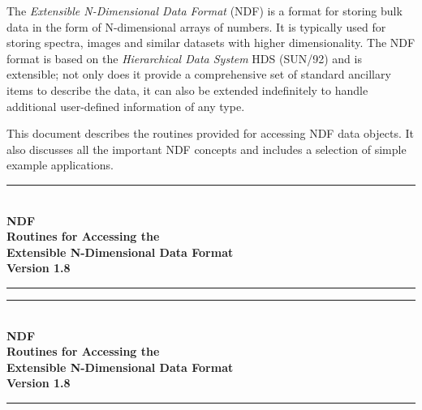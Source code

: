 \documentclass[twoside,11pt]{article}
\newcommand{\stardocinitials}  {SUN}
\newcommand{\stardocnumber}    {33.9}
\newcommand{\stardoctitle}     {NDF \\ [\latex{1ex}]
                                Routines for Accessing the\\
                                Extensible N-Dimensional Data Format}
\newcommand{\stardocversion}   {Version 1.8}
\newcommand{\stardocname}{\stardocinitials /\stardocnumber}
\newenvironment{latexonly}{}{}
\newcommand{\xref}[3]{#1}
\newcommand{\latex}[1]{#1}
\newcommand{\st}[1]{{\em{#1}}}
\renewcommand{\thepage}{\roman{page}}
\begin{document}
The \st{Extensible N-Dimensional Data Format\/} (NDF) is a format for
storing bulk data in the form of N-dimensional arrays of numbers. It
is typically used for storing spectra, images and similar datasets
with higher dimensionality. The NDF format is based on the
\st{Hierarchical Data System\/} HDS (\xref{SUN/92}{sun92}{}) and is
extensible; not only does it provide a comprehensive set of standard
ancillary items to describe the data, it can also be extended
indefinitely to handle additional user-defined information of any
type.

This document describes the routines provided for accessing NDF data
objects. It also discusses all the important NDF concepts and includes
a selection of simple example applications.
 \newpage
 \begin{latexonly}
   \null\vspace {5mm}
   \begin {center}
   \rule{80mm}{0.5mm} \\ [1ex]
   {\Large\bf \stardoctitle \\ [2.5ex]
              \stardocversion} \\ [2ex]
   \rule{80mm}{0.5mm}
   \end{center}
   \setlength{\parskip}{0mm}
   \tableofcontents
   \setlength{\parskip}{\medskipamount}
   \markright{\stardocname}
 \end{latexonly}
\newpage
\renewcommand{\thepage}{\arabic{page}}
\setcounter{page}{1}
\begin{latexonly}
   \null\vspace {5mm}
   \begin {center}
   \rule{80mm}{0.5mm} \\ [1ex]
   {\Large\bf \stardoctitle \\ [2.5ex]
              \stardocversion} \\ [2ex]
   \rule{80mm}{0.5mm}
   \end{center}

   \vspace{30mm}
\end{latexonly}
\end{document}
